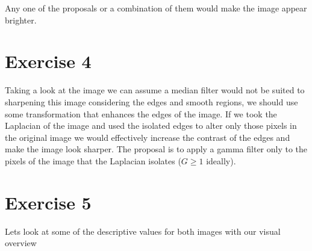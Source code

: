 \documentclass[12pt, a4paper]{article}
\begin{document}
\begin{multicols}{2}
    \begin{table}[H]
        \caption{Method Proposals}\label{tab:proposals3}
        \begin{center}
        \end{center}
    \end{table}

    Any one of the proposals or a combination of them would make the image appear brighter.
    \newline

    \section{Exercise 4} \label{sec:ex4}

    Taking a look at the image we can assume a median filter would not be suited to sharpening this image considering the edges and smooth regions, we should use some transformation that enhances the edges of the image. If we took the Laplacian of the image and used the isolated edges to alter only those pixels in the original image we would effectively increase the contrast of the edges and make the image look sharper. The proposal is to apply a gamma filter only to the pixels of the image that the Laplacian isolates ($G \geq 1$ ideally).
    \newline

    \section{Exercise 5} \label{sec:ex5}

    Lets look at some of the descriptive values for both images with our visual overview
    \newline


\end{multicols}
\end{document}

